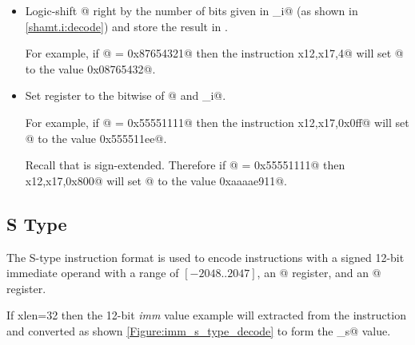 \begin{itemize}
\item{}
\label{insn:srli}

Logic-shift @ right by the number of bits given in \verb@shamt_i@
(as shown in \autoref{shamt.i:decode}) and store the result in \verb@rd@.

For example, if @ = \verb@0x87654321@ then the instruction 
\verb@srli x12,x17,4@ will set @ to the value \verb@0x08765432@.

\item{}
\label{insn:xori}

Set register \verb@rd@ to the bitwise \verb@xor@ of @ and \verb@imm_i@.

For example, if @ = \verb@0x55551111@ then the instruction 
\verb@xori x12,x17,0x0ff@ will set @ to the value \verb@0x555511ee@.

Recall that \verb@imm@ is sign-extended.
Therefore if @ = \verb@0x55551111@ then 
\verb@xori x12,x17,0x800@ will set @ to the value \verb@0xaaaae911@.

\end{itemize}


\subsection{S Type}
\label{insnformat:stype}

The S-type instruction format is used to encode instructions with a
signed 12-bit immediate operand with a range of $[-2048..2047]$,
an @ register, and an @ register.

If \Gls{xlen}=32 then the 12-bit {\em imm} value example will extracted 
from the instruction and converted as shown \autoref{Figure:imm_s_type_decode}
to form the \verb@imm_s@ value.

\begin{figure}[ht]
\centering
\DrawInsnOpSTypeDecoding
{}
\label{Figure:imm_s_type_decode}
\label{imm.s:decode}
\end{figure}

